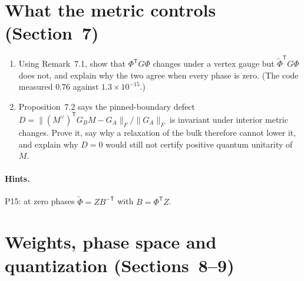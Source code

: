 \documentclass[11pt]{article}
\begin{document}
\section{What the metric controls (Section~7)}

\begin{enumerate}[label=\textbf{P\arabic*.},leftmargin=*,start=15]
\item Using Remark~7.1, show that $\Phi^{\mathsf T}G\Phi$ changes
  under a vertex gauge but $\tilde\Phi^{\mathsf T}G\Phi$ does not, and explain
  why the two agree when every phase is zero. (The code measured $0.76$
  against $1.3\times10^{-15}$.)
\item Proposition~7.2 says the pinned-boundary defect
  $D = \|(M^\vee)^{\mathsf T}G_BM-G_A\|_F/\|G_A\|_F$ is invariant under interior
  metric changes. Prove it, say why a relaxation of the bulk therefore cannot
  lower it, and explain why $D = 0$ would still not certify positive quantum
  unitarity of $M$.
\end{enumerate}

\paragraph{Hints.} P15: at zero phases $\tilde\Phi = Z B^{-\mathsf T}$ with $B = \Phi^{\mathsf T}Z$.

\section{Weights, phase space and quantization (Sections~8--9)}
\end{document}
